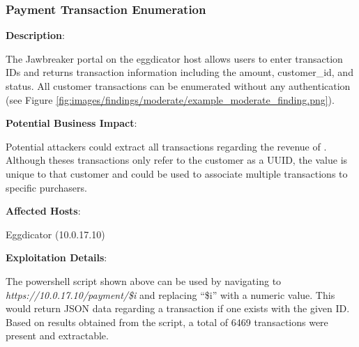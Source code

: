 \subsubsection{Payment Transaction Enumeration}
\label{sec:payment_enumeration}

    
    \color{black}{}
    \noindent
    \textbf{Description}:
    
    The Jawbreaker portal on the eggdicator host allows users to enter transaction IDs and returns transaction information including the amount, customer\_id, and status. All customer transactions can be enumerated without any authentication (see Figure \ref{fig:images/findings/moderate/example_moderate_finding.png}).
    
    
    \noindent
    \textbf{Potential Business Impact}:
    
    Potential attackers could extract all transactions regarding the revenue of \cptc. Although theses transactions only refer to the customer as a UUID, the value is unique to that customer and could be used to associate multiple transactions to specific purchasers. 
    
    
        \noindent
        \textbf{Affected Hosts}:
        
            Eggdicator (10.0.17.10)
    
    \noindent
    \textbf{Exploitation Details}:
    
    The powershell script shown above can be used by navigating to \textit{https://10.0.17.10/payment/\$i} and replacing ``\$i'' with a numeric value.  This would return JSON data regarding a transaction if one exists with the given ID. Based on results obtained from the script, a total of 6469 transactions were present and extractable.
    
